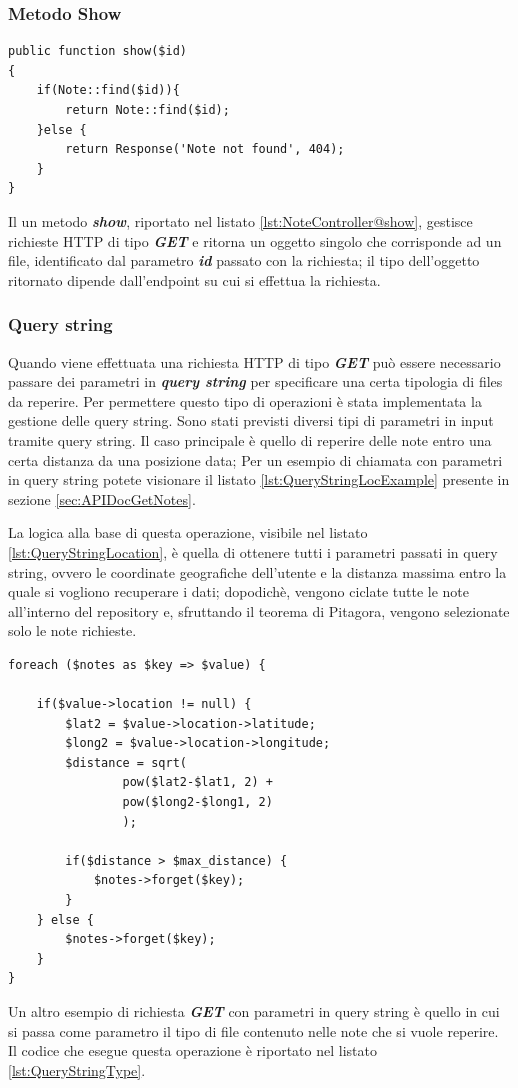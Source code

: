 \pagebreak
\subsubsection{Metodo Show}
\begin{lstlisting}[caption={Funzione \textit{\textbf{show}} del controller NoteController}, label={lst:NoteController@show}]
public function show($id) 
{
	if(Note::find($id)){
		return Note::find($id);
	}else {
		return Response('Note not found', 404);
	}
}
\end{lstlisting}

Il un metodo \textit{\textbf{show}}, riportato nel listato \ref{lst:NoteController@show}, gestisce richieste HTTP di tipo \textit{\textbf{GET}} e ritorna un oggetto singolo che corrisponde ad un file, identificato dal parametro \textit{\textbf{id}} passato con la richiesta; il tipo dell'oggetto ritornato dipende dall'endpoint su cui si effettua la richiesta.

\subsubsection{Query string}
Quando viene effettuata una richiesta HTTP di tipo \textit{\textbf{GET}} può essere necessario passare dei parametri in \textit{\textbf{query string}} per specificare una certa tipologia di files da reperire.
Per permettere questo tipo di operazioni è stata implementata la gestione delle query string.
Sono stati previsti diversi tipi di parametri in input tramite query string. Il caso principale è quello di reperire delle note entro una certa distanza da una posizione data; Per un esempio di chiamata con parametri in query string potete visionare il listato \ref{lst:QueryStringLocExample} presente in sezione \ref{sec:APIDocGetNotes}. 

La logica alla base di questa operazione, visibile nel listato \ref{lst:QueryStringLocation}, è quella di ottenere tutti i parametri passati in query string, ovvero le coordinate geografiche dell'utente e la distanza massima entro la quale si vogliono recuperare i dati; dopodichè, vengono ciclate tutte le note all'interno del repository e, sfruttando il teorema di Pitagora, vengono selezionate solo le note richieste.
\pagebreak
\begin{lstlisting}[caption={Recupero delle note entro una certa distanza da una posizione data}, label={lst:QueryStringLocation}]
foreach ($notes as $key => $value) {

	if($value->location != null) {
		$lat2 = $value->location->latitude;
		$long2 = $value->location->longitude;
		$distance = sqrt(
				pow($lat2-$lat1, 2) +
			 	pow($long2-$long1, 2)
			 	);

		if($distance > $max_distance) {
			$notes->forget($key);
		}    
	} else {
		$notes->forget($key);
	}
}
\end{lstlisting}
\pagebreak
Un altro esempio di richiesta \textit{\textbf{GET}} con parametri in query string è quello in cui si passa come parametro il tipo di file contenuto nelle note che si vuole reperire. Il codice che esegue questa operazione è riportato nel listato \ref{lst:QueryStringType}.

